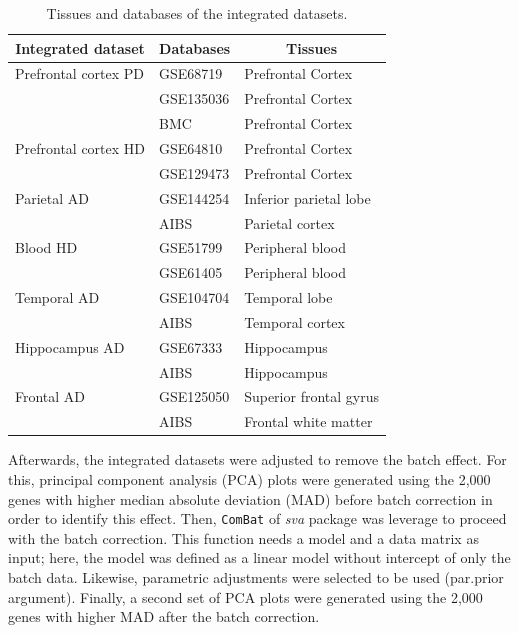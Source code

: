 \begin{table}[ht]
\centering
\caption{Tissues and databases of the integrated datasets.}
\label{tab:integrated-tissue}
\begin{tabular}{lll}
\hline
\multicolumn{1}{c}{\textbf{Integrated dataset}} & \multicolumn{1}{c}{\textbf{Databases}} & \multicolumn{1}{c}{\textbf{Tissues}} \\ \hline
Prefrontal cortex PD & GSE68719     & Prefrontal Cortex      \\
                     & GSE135036    & Prefrontal Cortex      \\
                     & BMC & Prefrontal Cortex      \\
Prefrontal cortex HD & GSE64810     & Prefrontal Cortex      \\
                     & GSE129473    & Prefrontal Cortex      \\
Parietal AD          & GSE144254    & Inferior parietal lobe \\
                     & AIBS         & Parietal cortex        \\
Blood HD             & GSE51799     & Peripheral blood       \\
                     & GSE61405     & Peripheral blood       \\
Temporal AD          & GSE104704    & Temporal lobe          \\
                     & AIBS         & Temporal cortex        \\
Hippocampus AD       & GSE67333     & Hippocampus            \\
                     & AIBS         & Hippocampus            \\
Frontal AD           & GSE125050    & Superior frontal gyrus \\
                     & AIBS         & Frontal white matter   \\ \hline
\end{tabular}
\end{table}

Afterwards, the integrated datasets were adjusted to remove the batch effect. For this, principal component analysis (PCA) plots were generated using the 2,000 genes with higher median absolute deviation (MAD) before batch correction in order to identify this effect. Then, \verb|ComBat| of \textit{sva} package was leverage to proceed with the batch correction. This function needs a model and a data matrix as input; here, the model was defined as a linear model without intercept of only the batch data. Likewise, parametric adjustments were selected to be used (par.prior argument). Finally, a second set of PCA plots were generated using the 2,000 genes with higher MAD after the batch correction.

